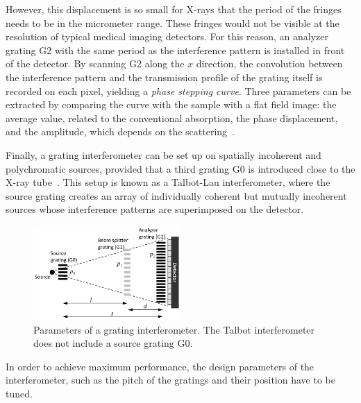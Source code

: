 \documentclass[a4paper]{spie}
\begin{document}
However, this displacement is so small for X-rays that the period of the fringes
needs to be in the micrometer range. These fringes would not be visible
at the resolution of typical medical imaging detectors. For this reason, an
analyzer grating G2 with the same period as the interference pattern is
installed in front of the detector. By scanning G2 along the $x$ direction, the convolution between
the interference pattern and the transmission profile of the grating itself
is recorded on each pixel, yielding a \emph{phase stepping curve}.
Three parameters can be extracted by comparing the curve with the sample
with a flat field image: the average value, related to the
conventional absorption, the phase displacement, and the amplitude, which
depends on the scattering~\cite{Wang2009}.

Finally, a grating interferometer can be set up on spatially incoherent and
polychromatic sources, provided that a third grating G0 is introduced close
to the X-ray tube~\cite{Pfeiffer2006,Chen2010a,Momose2009a}. This setup is
known as a Talbot-Lau interferometer, where the source grating
creates an array of individually coherent but mutually incoherent sources
whose interference patterns are superimposed on the detector.

\begin{figure}[h]
    \centering
    \includegraphics[width=0.5\textwidth]{grating_interferometer.eps}
    \caption{Parameters of a grating interferometer. The Talbot
    interferometer does not include a source grating G0.}
    \label{interferometer}
\end{figure}

In order to achieve maximum performance, the design parameters of the
interferometer, such as the pitch of the gratings and their position have to
be tuned. 
\end{document}
